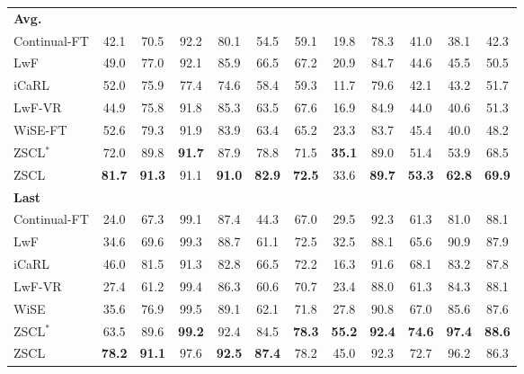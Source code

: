 \begin{table}[t]
{\begin{tabular}{@{}lccccccccccc@{}}
\quad \textbf{Avg.} \\
\quad \quad Continual-FT  & 42.1 & 70.5 & 92.2 & 80.1 & 54.5 & 59.1 & 19.8 & 78.3 & 41.0 & 38.1 & 42.3 \\
\quad \quad LwF~\cite{li2017learning}  & 49.0 & 77.0 & 92.1 & 85.9 & 66.5 & 67.2 & 20.9 & 84.7 & 44.6 & 45.5 & 50.5 \\
\quad \quad iCaRL~\cite{rebuffi2017icarl} & 52.0 & 75.9 & 77.4 & 74.6 & 58.4 & 59.3 & 11.7 & 79.6 & 42.1 & 43.2 & 51.7\\
\quad \quad LwF-VR  & 44.9 & 75.8 & 91.8 & 85.3 & 63.5 & 67.6 & 16.9 & 84.9 & 44.0 & 40.6 & 51.3 \\
\quad \quad WiSE-FT~\cite{wortsman2022robust}  & 52.6 & 79.3 & 91.9 & 83.9 & 63.4 & 65.2 & 23.3 & 83.7 & 45.4 & 40.0 & 48.2 \\
\quad \quad ZSCL$^*$ & 72.0 & 89.8 & \textbf{91.7} & 87.9 & 78.8 & 71.5 & \textbf{35.1} & 89.0 & 51.4 & 53.9 & 68.5 \\ 
\quad \quad ZSCL & \textbf{81.7} & \textbf{91.3} & 91.1 & \textbf{91.0} & \textbf{82.9} & \textbf{72.5} & 33.6 & \textbf{89.7} & \textbf{53.3} & \textbf{62.8} & \textbf{69.9} \\ \midrule

\quad \textbf{Last} \\
\quad \quad Continual-FT  & 24.0 & 67.3 & 99.1 & 87.4 & 44.3 & 67.0 & 29.5 & 92.3 & 61.3 & 81.0 & 88.1 \\
\quad \quad LwF~\cite{li2017learning}  & 34.6 & 69.6 & 99.3 & 88.7 & 61.1 & 72.5 & 32.5 & 88.1 & 65.6 & 90.9 & 87.9 \\
\quad \quad iCaRL~\cite{rebuffi2017icarl} & 46.0 & 81.5 & 91.3 & 82.8 & 66.5 & 72.2 & 16.3 & 91.6 & 68.1 & 83.2 & 87.8 \\
\quad \quad LwF-VR~\cite{ding2022don}  & 27.4 & 61.2 & 99.4 & 86.3 & 60.6 & 70.7 & 23.4 & 88.0 & 61.3 & 84.3 & 88.1 \\
\quad \quad WiSE~\cite{wortsman2022robust}  & 35.6 & 76.9 & 99.5 & 89.1 & 62.1 & 71.8 & 27.8 & 90.8 & 67.0 & 85.6 & 87.6 \\
\quad \quad ZSCL$^*$  & 63.5 & 89.6 & \textbf{99.2} & 92.4 & 84.5 & \textbf{78.3} & \textbf{55.2} & \textbf{92.4} & \textbf{74.6} & \textbf{97.4} & \textbf{88.6} \\ 
\quad \quad ZSCL  & \textbf{78.2} & \textbf{91.1} & 97.6 & \textbf{92.5} & \textbf{87.4} & 78.2 & 45.0 & 92.3 & 72.7 & 96.2 & 86.3 \\
\bottomrule
\end{tabular}%
}
\end{table}

